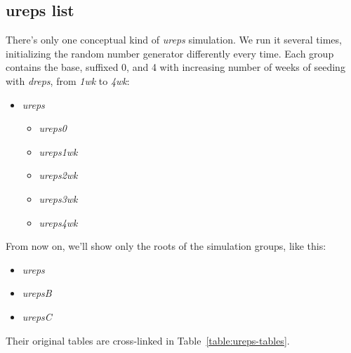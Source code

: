 \documentclass[10pt,oneside]{memoir}
\begin{document}
\subsection{ureps list}
\label{urepslist}

There's only one conceptual kind of {\itshape ureps} simulation.  We run it several times, initializing the random number generator differently every time.  Each group contains the base, suffixed $0$, and 4 with increasing number of weeks of seeding with {\itshape dreps}, from {\itshape 1wk} to {\itshape 4wk}:


\begin{itemize}


\item {\itshape ureps}\begin{itemize}


\item {\itshape ureps0}

\item {\itshape ureps1wk}

\item {\itshape ureps2wk}

\item {\itshape ureps3wk}

\item {\itshape ureps4wk}
\end{itemize}


\end{itemize}

From now on, we'll show only the roots of the simulation groups, like this:


\begin{itemize}


\item {\itshape ureps}

\item {\itshape urepsB}

\item {\itshape urepsC}
\end{itemize}

Their original tables are cross-linked in Table~\ref{table:ureps-tables}.
\end{document}
